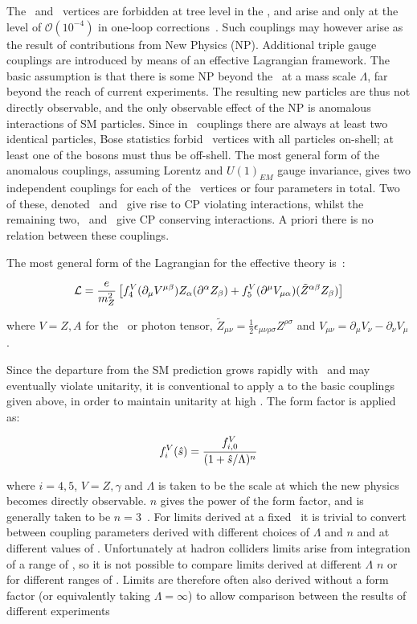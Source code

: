 The \ZZZ\ and \ZZg\ vertices are forbidden at tree level
in the \sm, and arise 
and only
at the level of  $\mathcal{O}(10^{-4})$ in one-loop
corrections~\cite{Gounaris:2000dn}.
Such couplings may however arise as the result of contributions from New Physics (NP).
Additional triple gauge couplings are introduced by means of an effective
Lagrangian framework. The basic assumption is that there is some NP beyond the
\sm\ at a mass scale $\Lambda$, far beyond the reach of current experiments. The resulting
new particles are thus not directly observable, and the only observable effect
of the NP is anomalous interactions of SM particles. Since in \ZZV\ couplings
there are always at least two identical particles, Bose statistics forbid \ZZV\
vertices with all particles on-shell; at least one of the bosons must thus be
off-shell. The most general form of the anomalous couplings, assuming Lorentz
and $U(1)_{EM}$ gauge invariance, gives two independent couplings for each of
the \ZZV\ vertices or four parameters in total. Two of these, denoted
\ffourZ\ and \ffourg\ give rise to CP violating interactions, whilst the
remaining two, \ffiveZ\ and \ffiveg\ give CP conserving interactions. A priori
there is no relation between these couplings. 

The most general form of the Lagrangian for the effective theory is~\cite{Gounaris:1999kf}:

\begin{align}
\mathcal{L} = \frac{e}{m_{Z}^{2}} \left[ 
f_{4}^{V}(\partial_{\mu}V^{\mu\beta})Z_{\alpha}(\partial^{\alpha}Z_{\beta}) +
f_{5}^{V}(\partial^{\mu}V_{\mu\alpha})(\tilde{Z}^{\alpha\beta}Z_{\beta}) \right]
\end{align}

where $V=Z,A$ for the \Z\ or photon tensor, $\tilde{Z}_{\mu\nu} = \frac{1}{2}
\epsilon_{\mu\nu\rho\sigma}Z^{\rho\sigma}$ and $V_{\mu\nu} = \partial_{\mu}V_{\nu}
- \partial_{\nu}V_{\mu}$.

Since the departure from the SM prediction grows rapidly with \sqrtshat\ and may
eventually violate unitarity, it is conventional to apply a \intro{form
factor} to the basic couplings given above, in order to maintain unitarity at
high \sqrtshat. The form factor is applied as:

\begin{align}
f_{i}^{V}(\hat{s}) = \frac{f^{V}_{i,0}}{(1 + \hat{s} / \Lambda)^{n}}
\end{align}

where $i=4,5$, $V=Z,\gamma$ and $\Lambda$ is taken to be the scale at which the
new physics becomes directly observable. $n$ gives the power of the form factor,
and is generally taken to be $n=3$~\cite{Baur:2000ae}. For limits derived at a
fixed \shat\ it is trivial to convert between coupling parameters derived with
different choices of $\Lambda$ and $n$ and at different values of \shat. 
Unfortunately at hadron colliders limits arise
from integration of a range of \shat, so it is not possible to compare
limits derived at different $\Lambda$ $n$ or for different ranges of \shat. 
Limits are therefore often also derived
without a form factor (or equivalently taking $\Lambda = \infty$) to allow
comparison between the results of different experiments

